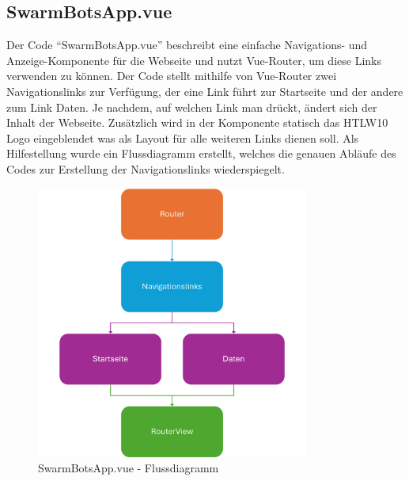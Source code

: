 \subsection{SwarmBotsApp.vue}
\label{subsec:frontend_SwarmBotsApp.vue}
Der Code ``SwarmBotsApp.vue'' beschreibt eine einfache Navigations- und Anzeige-Komponente
für die Webseite und nutzt Vue-Router, um diese Links verwenden zu können.  
%
Der Code stellt mithilfe von Vue-Router zwei Navigationslinks zur Verfügung,
der eine Link führt zur Startseite und der andere zum Link Daten. 
%
Je nachdem, auf welchen Link man drückt, ändert sich der Inhalt der Webseite.
%
Zusätzlich wird in der Komponente statisch das HTLW10 Logo eingeblendet was als Layout für alle weiteren 
Links dienen soll. 
%
Als Hilfestellung wurde ein Flussdiagramm erstellt, 
welches die genauen Abläufe des Codes zur Erstellung der Navigationslinks wiederspiegelt.
\begin{figure}[H]
  \includegraphics[width=0.8\textwidth, center]{img/SwarmBotsApp_FD.png}
  \caption{SwarmBotsApp.vue - Flussdiagramm}
  \label{fig:SwarmBotsApp_Flowchart}
\end{figure}

